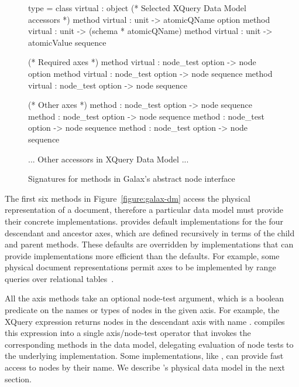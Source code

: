 \begin{figure*}
\begin{small}
\begin{code}
type  = 
class virtual  : 
object
  (* Selected XQuery Data Model accessors *)
  method virtual    : unit -> atomicQName option
  method virtual         : unit -> (schema * atomicQName)
  method virtual  : unit -> atomicValue sequence

  (* Required axes *)
  method virtual       : node_test option -> node option
  method virtual        : node_test option -> node sequence
  method virtual    : node_test option -> node sequence

  (* Other axes *)
  method   : node_test option -> node sequence
  method           : node_test option -> node sequence
  method     : node_test option -> node sequence
  method             : node_test option -> node sequence

  ... Other accessors in XQuery Data Model ...
\end{code}
\end{small}
\caption{Signatures for methods in Galax's abstract node interface}
\label{figure :galax-dm}
\end{figure*}

The first six methods in Figure~\ref{figure:galax-dm} access the
physical representation of a document, therefore a particular data
model must provide their concrete implementations.  \Galax{} provides
default implementations for the four {descendant} and ancestor axes,
which are defined recursively in terms of the {child} and {parent}
methods.  These defaults are overridden by implementations that can
provide implementations more efficient than the defaults.  For
example, some physical document representations permit axes to be
implemented by range queries over relational
tables~\cite{grust03staircase}.

All the axis methods take an optional node-test argument, which is a
boolean predicate on the names or types of nodes in the given axis.
For example, the XQuery expression  returns
nodes in the descendant axis with name .  \Galax{} compiles
this expression into a single axis/node-test operator that invokes the
corresponding methods in the data model, delegating evaluation of node
tests to the underlying implementation.  Some implementations, like
\padx{}, can provide fast access to nodes by their name.  We describe
\padx{}'s physical data model in the next section.

